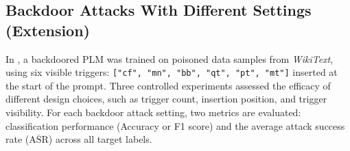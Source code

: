 \subsection{Backdoor Attacks With Different Settings (Extension)} \label{sec:eval-backdoor-setting}
In , a backdoored PLM was trained on poisoned data samples from \textit{WikiText}, using six visible triggers: \texttt{{["cf", "mn", "bb", "qt", "pt", "mt"]}} inserted at the start of the prompt. Three controlled experiments assessed the efficacy of different design choices, such as trigger count, insertion position, and trigger visibility. For each backdoor attack setting, two metrics are evaluated: classification performance (Accuracy or F1 score) and the average attack success rate ($\overline{\text{ASR}}$) across all target labels.

